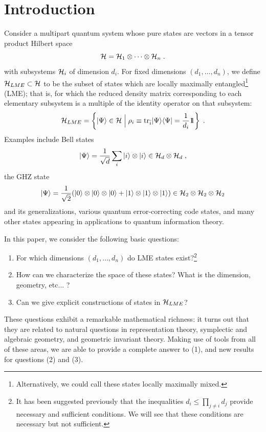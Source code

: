 \documentclass[12pt]{article}
\theoremstyle{definition}
\newcommand{\be}{\begin{equation}}
\newcommand{\ee}{\end{equation}}
\def\identity{{\rlap{1} \hskip 1.6pt \hbox{1}}}
\newcommand{\tr}{{\rm tr}}
\begin{document}
\section{Introduction}



Consider a multipart quantum system whose pure states are vectors in a tensor product Hilbert space
\[
{\cal H} = {\cal H}_{1} \otimes \cdots \otimes {\cal H}_{n} \; .
\]
with subsystems ${\cal H}_i$ of dimension $d_i$. For fixed dimensions $(d_1,\dots,d_n)$, we define ${\cal H}_{LME} \subset {\cal H}$ to be the subset of states which are locally maximally entangled\footnote{Alternatively, we could call these states locally maximally mixed.} (LME); that is, for which the reduced density matrix corresponding to each elementary subsystem is a multiple of the identity operator on that subsystem:
\be
{\cal H}_{LME} = \left\{|\Psi \rangle \in {\cal H} \; \Big| \; \rho_i \equiv \tr_{\bar{i}}|\Psi \rangle \langle \Psi | = {1 \over d_i} \identity \right\}\; .
\ee
Examples include Bell states
\be
\label{Bell}
|\Psi \rangle = {1 \over \sqrt{d}} \sum_{i} |i \rangle \otimes |i \rangle \in {\cal H}_d \otimes {\cal H}_d \; ,
\ee
the GHZ state
\be
\label{GHZ}
|\Psi \rangle = {1 \over \sqrt{2}} (|0 \rangle \otimes |0 \rangle \otimes |0 \rangle  + |1 \rangle \otimes |1 \rangle \otimes |1 \rangle) \in {\cal H}_2 \otimes {\cal H}_2 \otimes {\cal H}_2
\ee
and its generalizations, various quantum error-correcting code states,
and many other states appearing in applications to quantum information theory.

In this paper, we consider the following basic questions:
\begin{enumerate}
\item
For which dimensions $(d_1,\dots,d_n)$ do LME states exist?\footnote{It has been suggested previously that the inequalities $d_i \le \prod_{j \ne i} d_j$ provide necessary and sufficient conditions. We will see that these conditions are necessary but not sufficient.}
\item
How can we characterize the space of these states? What is the dimension, geometry, etc... ?
\item
Can we give explicit constructions of states in ${\cal H}_{LME}$?
\end{enumerate}
These questions exhibit a remarkable mathematical richness: it turns out that they are related to natural questions in representation theory, symplectic and algebraic geometry, and geometric invariant theory. Making use of tools from all of these areas, we are able to provide a complete answer to (1), and new results for questions (2) and (3).
\end{document}
